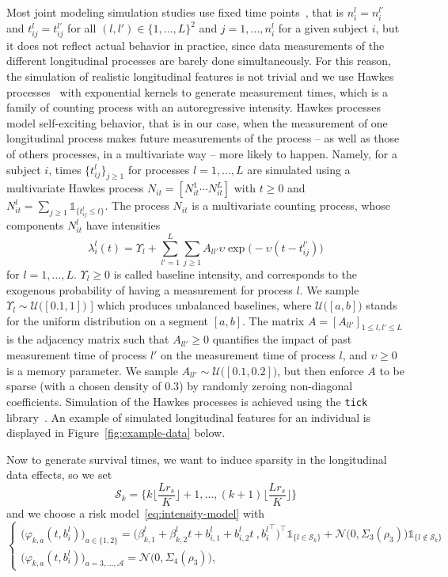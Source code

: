 \documentclass[11pt]{article}
\newcommand{\ind}[1]{\mathds{1}_{#1}}
\newcommand{\cN}{\mathcal N}
\newcommand{\cA}{\mathcal A}
\newcommand{\cU}{\mathcal U}
\newcommand{\cS}{\mathcal S}
\newcommand{\bSigma}{\textbf{$\Sigma$}}
\begin{document}
Most joint modeling simulation studies use fixed time points~\citep{hickey2018joinerml}, that is $n_i^l = n_i^{l'}$ and $t_{ij}^l = t_{ij}^{l'}$ for all $(l, l') \in \{1, \ldots, L\}^2$ and $j = 1, \ldots, n_i^l$ for a given subject $i$, but it does not reflect actual behavior in practice, since data measurements of the different longitudinal processes are barely done simultaneously. For this reason, the simulation of realistic longitudinal features is not trivial and we use Hawkes processes~\citep{hawkes1974cluster} with exponential kernels to generate measurement times, which is a family of counting process with an autoregressive intensity. 
Hawkes processes model self-exciting behavior, that is in our case, when the measurement of one longitudinal process makes future measurements of the process -- as well as those of others processes, in a multivariate way -- more likely to happen.
Namely, for a subject $i$, times $\{t_{ij}^l\}_{j \geq 1}$ for processes $l=1, \ldots, L$ are simulated using a multivariate Hawkes process $N_{it} = [N_{it}^1 \cdots N_{it}^L]$ with $t \geq 0$ and $N_{it}^l = \sum_{j \geq 1} \ind{\{t_{ij}^l \leq t\}}$. The process $N_{it}$ is a multivariate counting process, whose components $N_{it}^l$ have intensities
\[ \lambda_i^l(t) = \Upsilon_{l} + \sum_{l'=1}^L \sum_{j \geq 1} A_{ll'} \upsilon \exp\big(-\upsilon(t - t_{ij}^{l'}) \big) \]
for $l=1, \ldots, L$. $\Upsilon_{l} \geq 0$ is called baseline intensity, and corresponds to the exogenous probability of having a measurement for process $l$. We sample $\Upsilon_{l} \sim \cU\big([0.1,1]\big)$ ] which produces unbalanced baselines, where $\cU\big([a,b]\big)$ stands for the uniform distribution on a segment $[a,b]$.
The matrix $A = [A_{ll'}]_{1 \leq l,l' \leq L}$ is the adjacency matrix such that $A_{ll'} \geq 0$ quantifies the impact of past measurement time of process $l'$ on the measurement time of process $l$, and $\upsilon \geq 0$ is a memory parameter. We sample $A_{ll'} \sim \cU\big([0.1,0.2]\big)$, but then enforce $A$ to be sparse (with a chosen density of $0.3$) by randomly zeroing non-diagonal coefficients. Simulation of the Hawkes processes
is achieved using the \texttt{tick} library~\citep{bacry2017tick}. An example of simulated longitudinal features for an individual is displayed in Figure~\ref{fig:example-data} below. 

Now to generate survival times, we want to induce sparsity in the longitudinal data effects, so we set 
\[\cS_k=\Big\{ k \big\lfloor \dfrac{L r_s}{K} \big\rfloor + 1, \ldots,  (k + 1) \big\lfloor \dfrac{L r_s}{K} \big\rfloor \Big\}\] 
and we choose a risk model~\eqref{eq:intensity-model} with
\begin{equation*}
  \left\{
    \begin{array}{ll}
    \big(\varphi_{k,a}(t, b_i^l)\big)_{a \in \{1,2\}} = \big(\beta_{k,1}^l + \beta_{k,2}^l t + b_{i,1}^l + b_{i,2}^l t\ , {b_i^l}^\top \big)^\top \ind{\{l \in \cS_k\}} + \cN \big(0, \bSigma_3(\rho_3)\big) \ind{\{l \notin \cS_k\}}  \\
    \big( \varphi_{k,a}(t, b_i^l)\big)_{a=3,\ldots,\cA} = \cN \big(0, \bSigma_4(\rho_3)\big),
    \end{array}
  \right.
\end{equation*}
\end{document}
